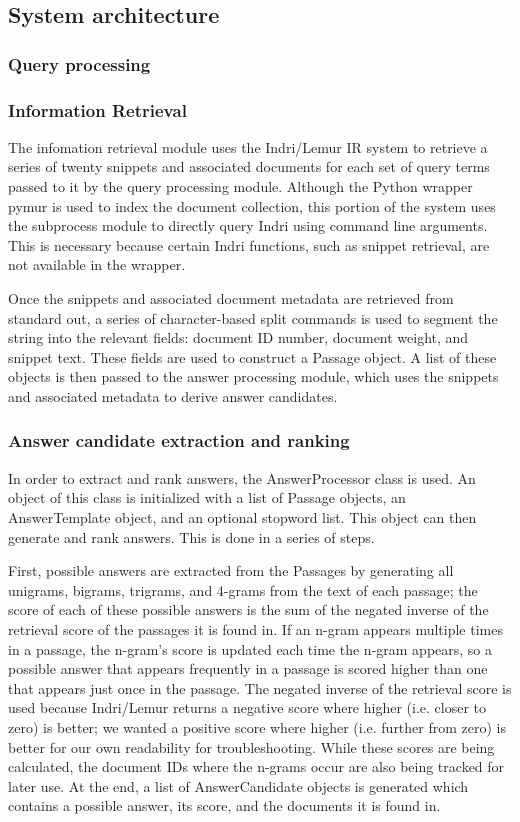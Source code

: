 \documentclass[11pt]{article}
\begin{document}
\subsection{System architecture}

\subsubsection{Query processing}

\subsubsection{Information Retrieval}

The infomation retrieval module uses the Indri/Lemur IR system to retrieve a series of twenty  snippets and associated documents for each set of query terms passed to it by the query processing module. Although the Python wrapper pymur is used to index the document collection, this portion of the system uses the subprocess module to directly query Indri using command line arguments. This is necessary because certain Indri functions, such as snippet retrieval, are not available in the wrapper. 

Once the snippets and associated document metadata are retrieved from standard out, a series of character-based split commands is used to segment the string into the relevant fields: document ID number, document weight, and snippet text. These fields are used to construct a Passage object. A list of these objects is then passed to the answer processing module, which uses the snippets and associated metadata to derive answer candidates.   


\subsubsection{Answer candidate extraction and ranking}

In order to extract and rank answers, the AnswerProcessor class is used.  An object of this class is initialized with a list of Passage objects, an AnswerTemplate object, and an optional stopword list.  This object can then generate and rank answers.  This is done in a series of steps.

First, possible answers are extracted from the Passages by generating all unigrams, bigrams, trigrams, and 4-grams from the text of each passage; the score of each of these possible answers is the sum of the negated inverse of the retrieval score of the passages it is found in.  If an n-gram appears multiple times in a passage, the n-gram's score is updated each time the n-gram appears, so a possible answer that appears frequently in a passage is scored higher than one that appears just once in the passage.  The negated inverse of the retrieval score is used because Indri/Lemur returns a negative score where higher (i.e. closer to zero) is better; we wanted a positive score where higher (i.e. further from zero) is better for our own readability for troubleshooting.  While these scores are being calculated, the document IDs where the n-grams occur are also being tracked for later use.  At the end, a list of AnswerCandidate objects is generated which contains a possible answer, its score, and the documents it is found in.
\end{document}

